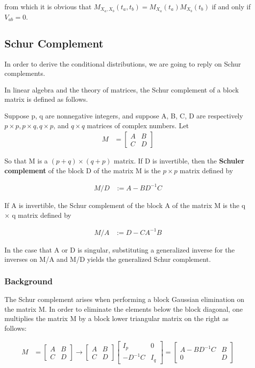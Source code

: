 \documentclass[11pt]{article} %
\begin{document}
from which it is obvious that $M_{X_a, X_b}(t_a, t_b) = M_{X_a}(t_a) M_{X_b}(t_b)$ if and only if $V_{ab} = 0$.

\subsection{Schur Complement}
In order to derive the conditional distributions, we are going to reply on Schur complements. 

In linear algebra and the theory of matrices, the Schur complement of a block matrix is defined as follows.

Suppose p, q are nonnegative integers, and suppose A, B, C, D are respectively $p \times p, p \times q, q \times p$, and $q \times q$ matrices of complex numbers. Let
\begin{align*}
M &= \begin{bmatrix}
	A & B \\
	C & D
\end{bmatrix}
\end{align*}

So that M is a $(p+q) \times (q + p)$ matrix. If D is invertible, then the \textbf{ Schuler complement
} of the block D of the matrix M is the $p \times p$ matrix defined by 

\begin{align*}
	M/D &:= A - B D^{-1} C
\end{align*}

If A is invertible, the Schur complement of the block A of the matrix M is the q × q matrix defined by

\begin{align*}
	M/A &:= D - C A^{-1} B
\end{align*}

In the case that A or D is singular, substituting a generalized inverse for the inverses on M/A and M/D yields the generalized Schur complement.

\subsubsection{Background}

The Schur complement arises when performing a block Gaussian elimination on the matrix M. In order to eliminate the elements below the block diagonal, one multiplies the matrix M by a block lower triangular matrix on the right as follows:

\begin{align*}
	M &= \begin{bmatrix}
		A & B \\
		C & D
	\end{bmatrix} \rightarrow \begin{bmatrix}
	A & B \\
	C & D
\end{bmatrix} \begin{bmatrix}
I_{p} & 0 \\
-D^{-1}C & I_{q}
\end{bmatrix} = \begin{bmatrix}
A - BD^{-1}C & B \\
0 & D
\end{bmatrix}
\end{align*}
\end{document}
